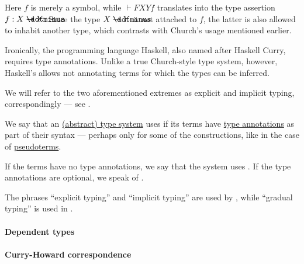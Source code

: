 \begin{remark}
  Here \( f \) is merely a symbol, while \( \vdash FXYf \) translates into the type assertion \( f: X \synimplies Y \). Since the type \( X \synimplies Y \) is not attached to \( f \), the latter is also allowed to inhabit another type, which contrasts with Church's usage mentioned earlier.

  Ironically, the programming language Haskell, also named after Haskell Curry, requires type annotations. Unlike a true Church-style type system, however, Haskell's allows not annotating terms for which the types can be inferred.

  We will refer to the two aforementioned extremes as explicit and implicit typing, correspondingly --- see .
\end{remark}

\begin{concept}\label{con:explicit_and_implicit_typing}
  We say that an \hyperref[def:abstract_type_system]{(abstract) type system} uses  if its terms have \hyperref[con:type_annotation]{type annotations} as part of their syntax --- perhaps only for some of the constructions, like in the case of \hyperref[def:pseudoterm]{pseudoterms}.

  If the terms have no type annotations, we say that the system uses . If the type annotations are optional, we speak of .
\end{concept}
\begin{comments}
  \item The phrases \enquote{explicit typing} and \enquote{implicit typing} are used by , while \enquote{gradual typing} is used in \cite{TypeScript:5.7:handbook}.
\end{comments}

\paragraph{Dependent types}

\begin{remark}\label{rem:dependent_types}
\end{remark}

\paragraph{Curry-Howard correspondence}\hfill

